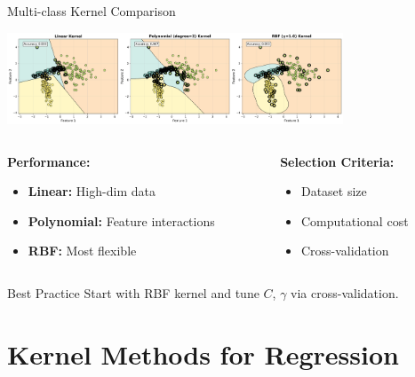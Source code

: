 \documentclass[8pt,aspectratio=1610]{beamer}
\begin{document}
\begin{frame}{Multi-class Kernel Comparison}
\begin{center}
\includegraphics[width=0.75\textwidth]{../figures/kernel_multiclass_comparison.png}
\end{center}

\begin{columns}[t]
\begin{column}{0.48\textwidth}
\textbf{Performance:}
\begin{itemize}
\setlength{\itemsep}{0pt}
\item \textbf{Linear:} High-dim data
\item \textbf{Polynomial:} Feature interactions
\item \textbf{RBF:} Most flexible
\end{itemize}
\end{column}

\begin{column}{0.48\textwidth}
\textbf{Selection Criteria:}
\begin{itemize}
\setlength{\itemsep}{0pt}
\item Dataset size
\item Computational cost
\item Cross-validation
\end{itemize}
\end{column}
\end{columns}

\begin{alertblock}{Best Practice}
Start with RBF kernel and tune $C$, $\gamma$ via cross-validation.
\end{alertblock}
\end{frame}

\section{Kernel Methods for Regression}
\end{document}
